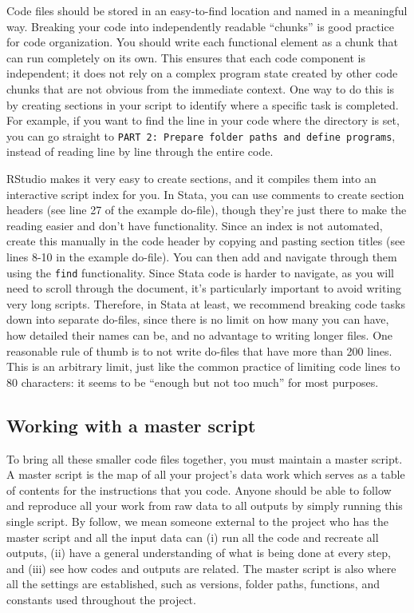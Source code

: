 Code files should be stored in an easy-to-find location and named in a meaningful way.
Breaking your code into independently readable ``chunks'' is good practice for code organization.
You should write each functional element as a chunk that can run completely on its own.
This ensures that each code component is independent;
it does not rely on a complex program state
created by other code chunks that are not obvious from the immediate context.
One way to do this is by creating sections in your script to identify where a specific task is completed.
For example, if you want to find the line in your code where the directory is set,
you can go straight to \texttt{PART 2: Prepare folder paths and define programs},
instead of reading line by line through the entire code.

RStudio makes it very easy to create sections,
and it compiles them into an interactive script index for you.
In Stata, you can use comments to create section headers
(see line 27 of the example do-file),
though they're just there to make the reading easier and don't have functionality.
Since an index is not automated,
create this manually in the code header by copying and pasting section titles
(see lines 8-10 in the example do-file).
You can then add and navigate through them using the \texttt{find} functionality.
Since Stata code is harder to navigate, as you will need to scroll through the document,
it's particularly important to avoid writing very long scripts.
Therefore, in Stata at least, we recommend breaking code tasks down
into separate do-files, since there is no limit on how many you can have,
how detailed their names can be, and no advantage to writing longer files.
One reasonable rule of thumb is to not write do-files that have more than 200 lines.
This is an arbitrary limit, just like the common practice of limiting code lines to 80 characters:
it seems to be ``enough but not too much'' for most purposes.

\subsection{Working with a master script}
To bring all these smaller code files together, you must maintain a master script.
A master script is the map of all your project's data work
which serves as a table of contents for the instructions that you code.
Anyone should be able to follow and reproduce all your work from
raw data to all outputs by simply running this single script.
By follow, we mean someone external to the project who has the master script and all the input data can
(i) run all the code and recreate all outputs,
(ii) have a general understanding of what is being done at every step, and
(iii) see how codes and outputs are related.
The master script is also where all the settings are established,
such as versions, folder paths, functions, and constants used throughout the project.

